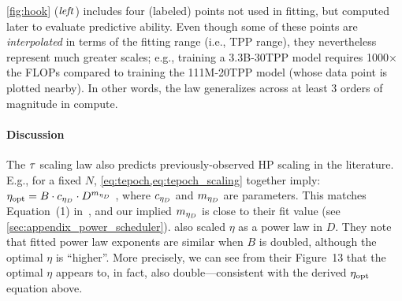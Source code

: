 \cref{fig:hook} ($\text{\emph{left}}$) includes four (labeled) points not used
in fitting, but computed later to evaluate predictive ability.
%
Even though some of these points are \emph{interpolated} in terms of
the fitting range (i.e., TPP range), they nevertheless represent much
greater scales; e.g., training a 3.3B-30TPP model requires
1000$\times$ the FLOPs compared to training the 111M-20TPP model
(whose data point is plotted nearby).
%
In other words, the law generalizes across at least 3 orders of
magnitude in compute.
%


\paragraph{Discussion}

The $\tau$ scaling law also predicts previously-observed HP scaling
in the literature.  E.g., for a fixed $N$,
\cref{eq:tepoch,eq:tepoch_scaling} together imply:
$\eta_{\text{opt}} = B \cdot c_{\eta_D} \cdot D^{m_{\eta_D}}$
, where $c_{\eta_D}$ and $m_{\eta_D}$ are parameters.  This matches
Equation~(1) in~\citet{shen2024power}, and our implied $m_{\eta_D}$ is
close to their fit value (see \cref{sec:appendix_power_scheduler}).
\citet{bjorck2024scaling} also scaled $\eta$ as a power law in $D$.
They note that fitted power law exponents are similar when $B$ is
doubled, although the optimal $\eta$ is ``higher''.  More precisely,
we can see from their Figure~13 that the optimal $\eta$ appears to, in
fact, also double---consistent with the derived $\eta_{\text{opt}}$ equation
above.

